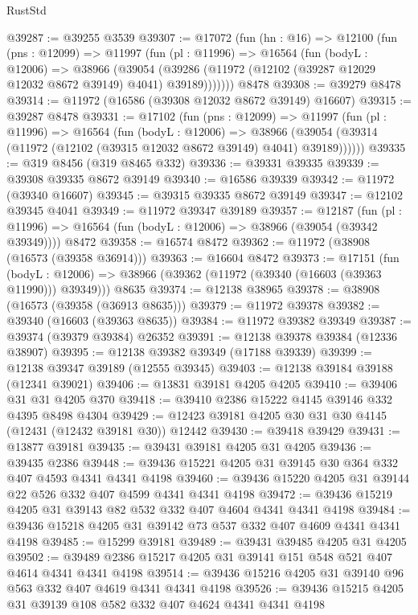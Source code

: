 \begin{lexlean}{RustStd}
\begin{coremodule}
@39287 := @39255 @3539
@39307 := @17072
    (fun (hn : @16) =>
    @12100
      (fun (pns : @12099) =>
      @11997
        (fun (pl : @11996) =>
        @16564
          (fun (bodyL : @12006) =>
          @38966
            (@39054 (@39286 (@11972 (@12102 (@39287 @12029 @12032 @8672 @39149) @4041) @39189)))))))
    @8478
@39308 := @39279 @8478
@39314 := @11972 (@16586 (@39308 @12032 @8672 @39149) @16607)
@39315 := @39287 @8478
@39331 := @17102
    (fun (pns : @12099) =>
    @11997
      (fun (pl : @11996) =>
      @16564
        (fun (bodyL : @12006) =>
        @38966 (@39054 (@39314 (@11972 (@12102 (@39315 @12032 @8672 @39149) @4041) @39189))))))
@39335 := @319 @8456 (@319 @8465 @332)
@39336 := @39331 @39335
@39339 := @39308 @39335 @8672 @39149
@39340 := @16586 @39339
@39342 := @11972 (@39340 @16607)
@39345 := @39315 @39335 @8672 @39149
@39347 := @12102 @39345 @4041
@39349 := @11972 @39347 @39189
@39357 := @12187
    (fun (pl : @11996) => @16564 (fun (bodyL : @12006) => @38966 (@39054 (@39342 @39349))))
    @8472
@39358 := @16574 @8472
@39362 := @11972 (@38908 (@16573 (@39358 @36914)))
@39363 := @16604 @8472
@39373 := @17151
    (fun (bodyL : @12006) => @38966 (@39362 (@11972 (@39340 (@16603 (@39363 @11990))) @39349)))
    @8635
@39374 := @12138 @38965
@39378 := @38908 (@16573 (@39358 (@36913 @8635)))
@39379 := @11972 @39378
@39382 := @39340 (@16603 (@39363 @8635))
@39384 := @11972 @39382 @39349
@39387 := @39374 (@39379 @39384) @26352
@39391 := @12138 @39378 @39384 (@12336 @38907)
@39395 := @12138 @39382 @39349 (@17188 @39339)
@39399 := @12138 @39347 @39189 (@12555 @39345)
@39403 := @12138 @39184 @39188 (@12341 @39021)
@39406 := @13831 @39181 @4205 @4205
@39410 := @39406 @31 @31 @4205 @370
@39418 := @39410 @2386 @15222 @4145 @39146 @332 @4395 @8498 @4304
@39429 := @12423 @39181 @4205 @30 @31 @30 @4145 (@12431 (@12432 @39181 @30)) @12442
@39430 := @39418 @39429
@39431 := @13877 @39181
@39435 := @39431 @39181 @4205 @31 @4205
@39436 := @39435 @2386
@39448 := @39436 @15221 @4205 @31 @39145 @30 @364 @332 @407 @4593 @4341 @4341 @4198
@39460 := @39436 @15220 @4205 @31 @39144 @22 @526 @332 @407 @4599 @4341 @4341 @4198
@39472 := @39436 @15219 @4205 @31 @39143 @82 @532 @332 @407 @4604 @4341 @4341 @4198
@39484 := @39436 @15218 @4205 @31 @39142 @73 @537 @332 @407 @4609 @4341 @4341 @4198
@39485 := @15299 @39181
@39489 := @39431 @39485 @4205 @31 @4205
@39502 := @39489 @2386 @15217 @4205 @31 @39141 @151 @548 @521 @407 @4614 @4341 @4341 @4198
@39514 := @39436 @15216 @4205 @31 @39140 @96 @563 @332 @407 @4619 @4341 @4341 @4198
@39526 := @39436 @15215 @4205 @31 @39139 @108 @582 @332 @407 @4624 @4341 @4341 @4198

\end{coremodule}
\end{lexlean}
